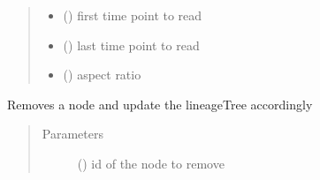 \documentclass[letterpaper,10pt,english]{sphinxmanual}
\begin{document}
\begin{fulllineitems}
\begin{fulllineitems}
\begin{quote}
\begin{description}
\begin{itemize}
\item {} 
 () \textendash{} first time point to read

\item {} 
 () \textendash{} last time point to read

\item {} 
 () \textendash{} aspect ratio

\end{itemize}

\end{description}\end{quote}

\end{fulllineitems}


\begin{fulllineitems}
\label{\detokenize{index:LineageTree.lineageTree.remove_node}}
Removes a node and update the lineageTree accordingly
\begin{quote}\begin{description}
\item[{Parameters}] \leavevmode
{} () \textendash{} id of the node to remove

\end{description}\end{quote}

\end{fulllineitems}



\end{fulllineitems}
\end{document}
